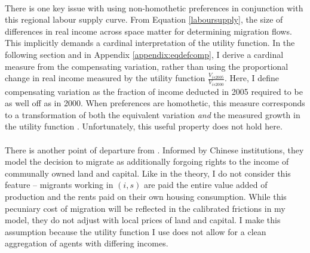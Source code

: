 \documentclass[]{article}
\theoremstyle{plain}
\begin{document}
\paragraph*{}
There is one key issue with using non-homothetic preferences in conjunction with this regional labour supply curve. From Equation  \eqref{laboursupply}, the size of differences in real income across space matter for  determining migration flows.  This implicitly demands a cardinal interpretation of the utility function. In the following section and in Appendix \ref{appendix:eqdefcomp}, I derive a cardinal measure from the compensating variation, rather than using the proportional change in real income measured by the utility function $\frac{V_{is2005}}{V_{is2000}}$. Here, I define compensating variation as the fraction of income deducted in 2005 required to be as well off as in 2000. When preferences are homothetic, this measure corresponds to a transformation of both the equivalent variation \textit{and} the measured growth in the utility function \citep{samswamy}. Unfortunately, this useful property does not hold here.

\paragraph*{}
There is another point of departure from \cite{tombezhu}. Informed by Chinese institutions, they model the decision to migrate as additionally forgoing rights to the income of communally owned land and capital. Like in the theory, I do not consider this feature -- migrants working in $(i,s)$ are paid the entire value added of production and the rents paid on their own housing consumption. While this pecuniary cost of migration will be reflected in the calibrated frictions in my model, they do not adjust with local prices of land and capital. I make this assumption because the utility function I use does not allow for a clean aggregation of agents with differing incomes. 

\end{document}
